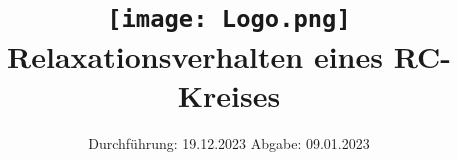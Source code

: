 

\subject{V353}
\title{\texttt{[image: Logo.png]}
Relaxationsverhalten eines RC-Kreises}
\date{%
  Durchführung: 19.12.2023
  \hspace{3em}
  Abgabe: 09.01.2023
}





\maketitle
\thispagestyle{empty}
\tableofcontents
\newpage







\printbibliography{}


